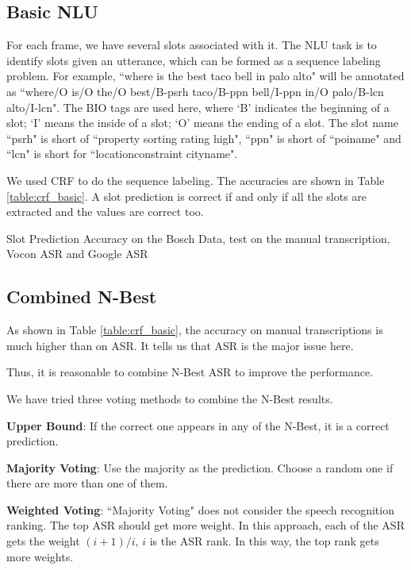 \documentclass[11pt,letterpaper]{article}
\begin{document}
\subsection{Basic NLU}
For each frame, we have several slots associated with it. The NLU task is to identify slots given an utterance, which can be formed as a sequence labeling problem. For example, ``where is the best taco bell in palo alto" will be annotated as ``where/O is/O the/O best/B-psrh taco/B-ppn bell/I-ppn in/O palo/B-lcn alto/I-lcn". The BIO tags are used here, where `B' indicates the beginning of a slot; `I' means the inside of a slot; `O' means the ending of a slot. The slot name ``psrh" is short of ``property sorting rating high", ``ppn" is short of ``poiname" and ``lcn" is short for ``locationconstraint cityname".

We used CRF \cite{Lafferty:2001} to do the sequence labeling. The accuracies are shown in Table \ref{table:crf_basic}. A slot prediction is correct if and only if all the slots are extracted and the values are correct too.

\begin{table}[!htb] 
\centering 
 
\caption{Slot Prediction Accuracy on the Bosch Data, test on the manual transcription, Vocon ASR and Google ASR} 
\label{table:crf_basic} 
\end{table} 

\subsection{Combined N-Best}
As shown in Table \ref{table:crf_basic}, the accuracy on manual transcriptions is much higher than on ASR. It tells us that ASR is the major issue here.

Thus, it is reasonable to combine N-Best ASR to improve the performance.

We have tried three voting methods to combine the N-Best results.
 
{\bf Upper Bound}: 
If the correct one appears in any of the N-Best, it is a correct prediction. 
 
{\bf Majority Voting}: 
Use the majority as the prediction. Choose a random one if there are more than one of them. 
 
{\bf Weighted Voting}: 
``Majority Voting" does not consider the speech recognition ranking. The top ASR should get more weight. In this approach, each of the ASR gets the weight $(i+1)/i$, $i$ is the ASR rank. In this way, the top rank gets more weights.
\end{document}
